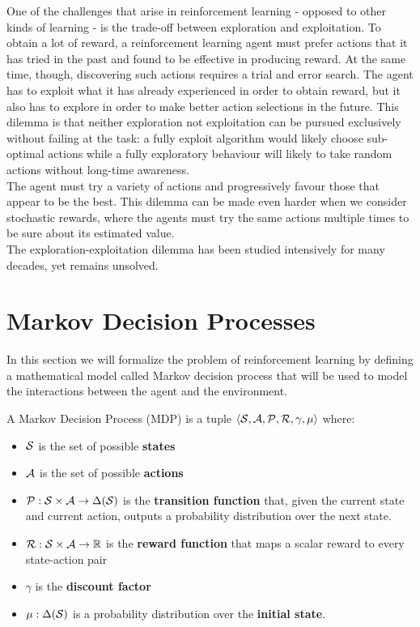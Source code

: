 One of the challenges that arise in reinforcement learning - opposed to other kinds of learning - is the trade-off between exploration and exploitation. To obtain a lot of reward, a reinforcement learning agent must prefer actions that it has tried in the past and found to be effective in producing reward. At the same time, though, discovering such actions requires a trial and error search. The agent has to exploit what it has already experienced in order to obtain reward, but it also has to explore in order to make better action selections in the future. This dilemma is that neither exploration not exploitation can be pursued exclusively without failing at the task: a fully exploit algorithm would likely choose sub-optimal actions while a fully exploratory behaviour will likely to take random actions without long-time awareness.\\
The agent must try a variety of actions and progressively favour those that appear to be the best. This dilemma can be made even harder when we consider stochastic rewards, where the agents must try the same actions multiple times to be sure about its estimated value. \\
The exploration-exploitation dilemma has been studied intensively for many decades, yet remains unsolved.



\section{Markov Decision Processes}
\label{sec:mdp}
In this section we will formalize the problem of reinforcement learning by defining a mathematical model called Markov decision process that will be used to model the interactions between the agent and the environment.
\begin{definition}
A Markov Decision Process (MDP) is a tuple $\left\langle \mathcal{S}, \mathcal{A}, \mathcal{P}, \mathcal{R}, \gamma, \mu \right\rangle$  where:
\begin{itemize}
\item $\mathcal{S}$ is the set of possible \textbf{states}
\item $\mathcal{A}$ is the set of possible \textbf{actions}
\item $\mathcal{P} : \mathcal{S} \times \mathcal{A} \rightarrow \Delta (\mathcal{S})$ is the \textbf{transition function} that, given the current state and current action, outputs a probability distribution over the next state.
\item $\mathcal{R} : \mathcal{S} \times \mathcal{A} \rightarrow \mathbb{R}$ is the \textbf{reward function} that maps a scalar reward to every state-action pair
\item $\gamma$ is the \textbf{discount factor}
\item $\mu : \Delta ( \mathcal{S} )$ is a probability distribution over the \textbf{initial state}. 
\end{itemize}
\end{definition}

